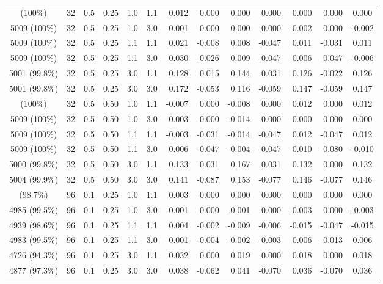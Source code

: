 \begin{longtable}[t]{ccccccrrrrrrc}
\addlinespace
5008 (100\%) & 32 & 0.5 & 0.25 & 1.0 & 1.1 & 0.012 & 0.000 & 0.000 & 0.000 & 0.000 & 0.000 & 0.000\\
5009 (100\%) & 32 & 0.5 & 0.25 & 1.0 & 3.0 & 0.001 & 0.000 & 0.000 & 0.000 & -0.002 & 0.000 & -0.002\\
5009 (100\%) & 32 & 0.5 & 0.25 & 1.1 & 1.1 & 0.021 & -0.008 & 0.008 & -0.047 & 0.011 & -0.031 & 0.011\\
5009 (100\%) & 32 & 0.5 & 0.25 & 1.1 & 3.0 & 0.030 & -0.026 & 0.009 & -0.047 & -0.006 & -0.047 & -0.006\\
5001 (99.8\%) & 32 & 0.5 & 0.25 & 3.0 & 1.1 & 0.128 & 0.015 & 0.144 & 0.031 & 0.126 & -0.022 & 0.126\\
5001 (99.8\%) & 32 & 0.5 & 0.25 & 3.0 & 3.0 & 0.172 & -0.053 & 0.116 & -0.059 & 0.147 & -0.059 & 0.147\\
\addlinespace
5008 (100\%) & 32 & 0.5 & 0.50 & 1.0 & 1.1 & -0.007 & 0.000 & -0.008 & 0.000 & 0.012 & 0.000 & 0.012\\
5009 (100\%) & 32 & 0.5 & 0.50 & 1.0 & 3.0 & -0.003 & 0.000 & -0.014 & 0.000 & 0.000 & 0.000 & 0.000\\
5009 (100\%) & 32 & 0.5 & 0.50 & 1.1 & 1.1 & -0.003 & -0.031 & -0.014 & -0.047 & 0.012 & -0.047 & 0.012\\
5009 (100\%) & 32 & 0.5 & 0.50 & 1.1 & 3.0 & 0.006 & -0.047 & -0.004 & -0.047 & -0.010 & -0.080 & -0.010\\
5000 (99.8\%) & 32 & 0.5 & 0.50 & 3.0 & 1.1 & 0.133 & 0.031 & 0.167 & 0.031 & 0.132 & 0.000 & 0.132\\
5004 (99.9\%) & 32 & 0.5 & 0.50 & 3.0 & 3.0 & 0.141 & -0.087 & 0.153 & -0.077 & 0.146 & -0.077 & 0.146\\
\addlinespace
4944 (98.7\%) & 96 & 0.1 & 0.25 & 1.0 & 1.1 & 0.003 & 0.000 & 0.000 & 0.000 & 0.000 & 0.000 & 0.000\\
4985 (99.5\%) & 96 & 0.1 & 0.25 & 1.0 & 3.0 & 0.001 & 0.000 & -0.001 & 0.000 & -0.003 & 0.000 & -0.003\\
4939 (98.6\%) & 96 & 0.1 & 0.25 & 1.1 & 1.1 & 0.004 & -0.002 & -0.009 & -0.006 & -0.015 & -0.047 & -0.015\\
4983 (99.5\%) & 96 & 0.1 & 0.25 & 1.1 & 3.0 & -0.001 & -0.004 & -0.002 & -0.003 & 0.006 & -0.013 & 0.006\\
4726 (94.3\%) & 96 & 0.1 & 0.25 & 3.0 & 1.1 & 0.032 & 0.000 & 0.019 & 0.000 & 0.018 & 0.000 & 0.018\\
4877 (97.3\%) & 96 & 0.1 & 0.25 & 3.0 & 3.0 & 0.038 & -0.062 & 0.041 & -0.070 & 0.036 & -0.070 & 0.036\\

\end{longtable}
